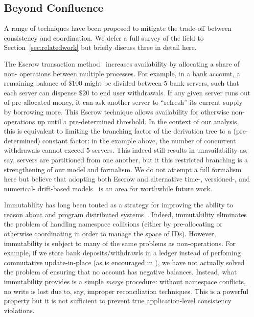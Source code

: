 
\subsection{Beyond Confluence}

A range of techniques have been proposed to mitigate the trade-off
between consistency and coordination. We defer a full survey of the
field to Section~\ref{sec:relatedwork} but briefly discuss three in
detail here.

 The Escrow transaction method~\cite{escrow}
increases availability by allocating a share of non-\iconfluent
operations between multiple processes. For example, in a bank account,
a remaining balance of $\$100$ might be divided between $5$ bank
servers, such that each server can dispense $\$20$ to end user
withdrawals. If any given server runs out of pre-allocated money, it
can ask another server to ``refresh'' its current supply by borrowing
more. This Escrow technique allows availability for otherwise
non-\iconfluent operations up until a pre-determined threshold. In the
context of our \cfreedom analysis, this is equivalent to limiting the
branching factor of the derivation tree to a (pre-determined) constant
factor: in the example above, the number of concurrent withdrawals
cannot exceed $5$ servers. This indeed still results in unavailability
as, say, servers are partitioned from one another, but it this
restricted branching is a strengthening of our model and formalism. We
do not attempt a full formalism here but believe that adopting both
Escrow and alternative time-, versioned-, and numerical- drift-based
models~\cite{yu-conit} is an area for worthwhile future work.

 Immutablilty has long been touted as a
strategy for improving the ability to reason about and program
distributed systems~\cite{helland-immutable,gray-virtues}. Indeed,
immutability eliminates the problem of handling namespace collisions
(either by pre-allocating or otherwise coordinating in order to manage
the space of IDs). However, immutability is subject to many of the
same problems as non-\iconfluent operations. For example, if we store
bank deposits/withdrawls in a ledger instead of perfoming commutative
update-in-place (as is encouraged in \lang), we have not actually
solved the problem of ensuring that no account has negative
balances. Instead, what immutability provides is a simple
\textit{merge} procedure: without namespace conflicts, no write is
lost due to, say, improper reconciliation techniques. This is a
powerful property but it is not sufficient to prevent true
application-level consistency violations.


